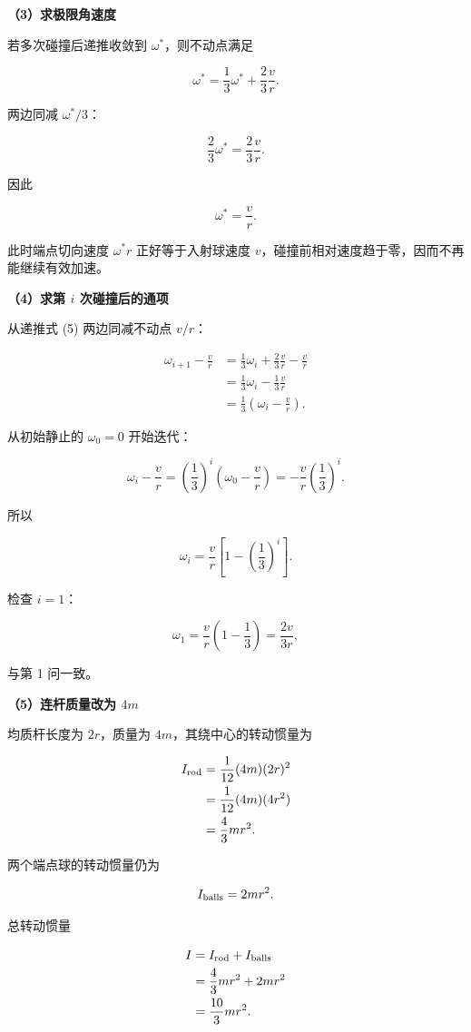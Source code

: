 \documentclass[12pt,a4paper,UTF8]{ctexart}
\begin{document}
\textbf{（3）求极限角速度}

若多次碰撞后递推收敛到 \(\omega^*\)，则不动点满足

\[
\omega^*=\frac13\omega^*+\frac23\frac vr.
\]

两边同减 \(\omega^*/3\)：

\[
\frac23\omega^*=\frac23\frac vr.
\]

因此

\[
\boxed{\omega^*=\frac vr}.
\]

此时端点切向速度 \(\omega^*r\) 正好等于入射球速度
\(v\)，碰撞前相对速度趋于零，因而不再能继续有效加速。

\textbf{（4）求第 \(i\) 次碰撞后的通项}

从递推式 (5) 两边同减不动点 \(v/r\)：

\[
\begin{aligned}
\omega_{i+1}-\frac vr
&=\frac13\omega_i+\frac23\frac vr-\frac vr\\
&=\frac13\omega_i-\frac13\frac vr\\
&=\frac13\left(\omega_i-\frac vr\right).
\end{aligned}
\]

从初始静止的 \(\omega_0=0\) 开始迭代：

\[
\omega_i-\frac vr
=\left(\frac13\right)^i
\left(\omega_0-\frac vr\right)
=-\frac vr\left(\frac13\right)^i.
\]

所以

\[
\boxed{\omega_i=\frac vr\left[1-\left(\frac13\right)^i\right]}.
\]

检查 \(i=1\)：

\[
\omega_1=\frac vr\left(1-\frac13\right)=\frac{2v}{3r},
\]

与第 1 问一致。

\textbf{（5）连杆质量改为 \(4m\)}

均质杆长度为 \(2r\)，质量为 \(4m\)，其绕中心的转动惯量为

\[
\begin{aligned}
I_{\rm rod}
&=\frac1{12}(4m)(2r)^2\\
&=\frac1{12}(4m)(4r^2)\\
&=\frac43mr^2.
\end{aligned}
\]

两个端点球的转动惯量仍为

\[I_{\rm balls}=2mr^2.\]

总转动惯量

\[
\begin{aligned}
I
&=I_{\rm rod}+I_{\rm balls}\\
&=\frac43mr^2+2mr^2\\
&=\frac{10}{3}mr^2.
\end{aligned}
\]
\end{document}
